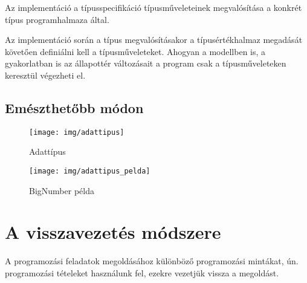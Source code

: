 \documentclass[margin=0px]{article}
\begin{document}
	Az implementáció a típusspecifikáció típusműveleteinek megvalósítása a konkrét típus programhalmaza által.
	
	Az implementáció során a típus megvalósításakor a típusértékhalmaz megadását követően definiálni kell a típusműveleteket. Ahogyan a modellben is, a gyakorlatban is az állapottér változásait a program csak a típusműveleteken keresztül végezheti el.
	
	\subsection{Emészthetőbb módon}
	
	\begin{figure}[H]
		\centering
		\texttt{[image: img/adattipus]}
		\caption{Adattípus}
		\label{fig:adattipus}
	\end{figure}

	\begin{figure}[H]
		\centering
		\texttt{[image: img/adattipus\_pelda]}
		\caption{BigNumber példa}
		\label{fig:adattipus_pelda}
	\end{figure}	
	
	\section{A visszavezetés módszere}
	
	A programozási feladatok megoldásához különböző programozási mintákat, ún. programozási tételeket használunk fel, ezekre vezetjük vissza
	a megoldást.\\
	
\end{document}
